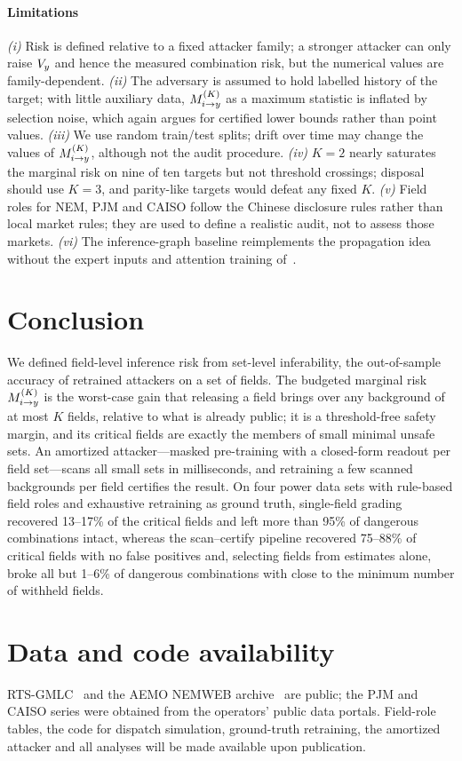 \paragraph{Limitations}
\emph{(i)} Risk is defined relative to a fixed attacker family; a stronger attacker can only raise
$V_{y}$ and hence the measured combination risk, but the numerical values are family-dependent.
\emph{(ii)} The adversary is assumed to hold labelled history of the target; with little auxiliary
data, $M^{(K)}_{i \to y}$ as a maximum statistic is inflated by selection noise, which again argues for certified
lower bounds rather than point values. \emph{(iii)} We use random train/test splits; drift over time
may change the values of $M^{(K)}_{i \to y}$, although not the audit procedure. \emph{(iv)} $K=2$ nearly saturates the marginal risk on nine of ten targets but not threshold
crossings; disposal should use $K=3$, and parity-like targets would defeat any fixed $K$. \emph{(v)} Field roles for NEM, PJM and CAISO follow the Chinese disclosure rules rather
than local market rules; they are used to define a realistic audit, not to assess those markets.
\emph{(vi)} The inference-graph baseline reimplements the propagation idea without the expert inputs
and attention training of~\cite{hu2026ignn}.

\section{Conclusion}\label{sec:conclusion}

We defined field-level inference risk from set-level inferability, the out-of-sample accuracy of
retrained attackers on a set of fields. The budgeted marginal risk $M^{(K)}_{i \to y}$ is the worst-case gain
that releasing a field brings over any background of at most $K$ fields, relative to what is
already public; it is a threshold-free safety margin, and its critical fields are exactly the
members of small minimal unsafe sets. An amortized attacker---masked pre-training with a
closed-form readout per field set---scans all small sets in milliseconds, and retraining a few
scanned backgrounds per field certifies the result. On four power data sets with rule-based field
roles and exhaustive retraining as ground truth, single-field grading recovered 13--17\% of the
critical fields and left more than 95\% of dangerous combinations intact, whereas the scan--certify
pipeline recovered 75--88\% of critical fields with no false positives and, selecting fields from
estimates alone, broke all but 1--6\% of dangerous combinations with close to the minimum number of
withheld fields.

\section*{Data and code availability}
RTS-GMLC~\cite{barrows2020rts} and the AEMO NEMWEB archive~\cite{aemo2024nemweb} are public; the PJM and CAISO series
were obtained from the operators' public data portals. Field-role tables, the code for dispatch simulation, ground-truth
retraining, the amortized attacker and all analyses will be made available upon publication.
